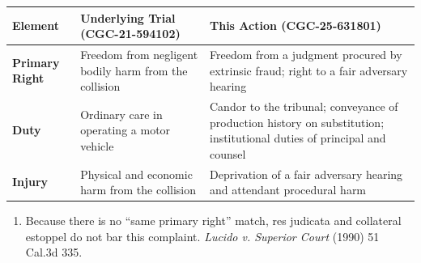 {\def\LTcaptype{table} %
\begin{longtable}[]{@{}
  >{\raggedright\arraybackslash}p{}
  >{\raggedright\arraybackslash}p{}
  >{\raggedright\arraybackslash}p{}@{}}
\toprule\noalign{}
\begin{minipage}[b]{\linewidth}\raggedright
Element
\end{minipage} & \begin{minipage}[b]{\linewidth}\raggedright
Underlying Trial (CGC-21-594102)
\end{minipage} & \begin{minipage}[b]{\linewidth}\raggedright
This Action (CGC-25-631801)
\end{minipage} \\
\midrule\noalign{}
\endhead
\bottomrule\noalign{}
\endlastfoot
\textbf{Primary Right} & Freedom from negligent bodily harm from the collision & Freedom from a judgment procured by extrinsic fraud; right to a fair adversary hearing \\
\textbf{Duty} & Ordinary care in operating a motor vehicle & Candor to the tribunal; conveyance of production history on substitution; institutional duties of principal and counsel \\
\textbf{Injury} & Physical and economic harm from the collision & Deprivation of a fair adversary hearing and attendant procedural harm \\
\end{longtable}
}

\begin{enumerate}
\def\labelenumi{\arabic{enumi}.}
\setcounter{enumi}{25}
\tightlist
\item
  Because there is no ``same primary right'' match, res judicata and collateral estoppel do not bar this complaint. \emph{Lucido v. Superior Court} (1990) 51 Cal.3d 335.
\end{enumerate}

